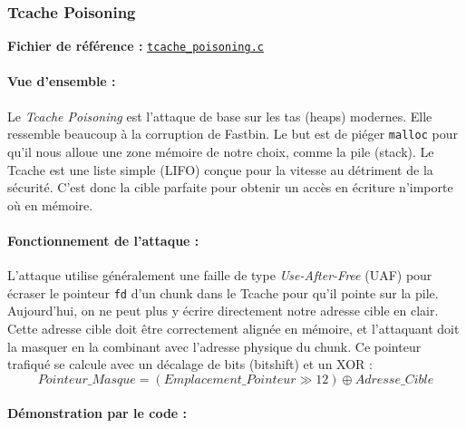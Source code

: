 
\subsubsection{Tcache Poisoning}

\noindent\textbf{Fichier de référence :} \href{https://github.com/shellphish/how2heap/blob/master/glibc_2.41/tcache_poisoning.c}{\texttt{tcache\_poisoning.c}}

\paragraph{Vue d'ensemble :}
Le \textit{Tcache Poisoning} est l'attaque de base sur les tas (heaps) modernes. Elle ressemble beaucoup à la corruption de Fastbin. Le but est de piéger \texttt{malloc} pour qu'il nous alloue une zone mémoire de notre choix, comme la pile (stack). Le Tcache est une liste simple (LIFO) conçue pour la vitesse au détriment de la sécurité. C'est donc la cible parfaite pour obtenir un accès en écriture n'importe où en mémoire.

\paragraph{Fonctionnement de l'attaque :}
L'attaque utilise généralement une faille de type \textit{Use-After-Free} (UAF) pour écraser
le pointeur \texttt{fd} d'un chunk dans le Tcache pour qu'il pointe sur la pile.
Aujourd'hui, on ne peut plus y écrire directement notre adresse cible en clair.
Cette adresse cible doit être correctement alignée en mémoire, et l'attaquant doit la masquer en
la combinant avec l'adresse physique du chunk.
Ce pointeur trafiqué se calcule avec un décalage de bits (bitshift) et un XOR :
$$Pointeur\_Masque = (Emplacement\_Pointeur \gg 12) \oplus Adresse\_Cible$$

\paragraph{Démonstration par le code :}

